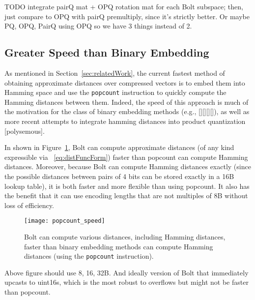 TODO integrate pairQ mat + OPQ rotation mat for each Bolt subspace; then, just compare to OPQ with pairQ premultiply, since it's strictly better. Or maybe PQ, OPQ, PairQ using OPQ so we have 3 things instead of 2.


\subsection{Greater Speed than Binary Embedding}

As mentioned in Section~\ref{sec:relatedWork}, the current fastest method of obtaining approximate distances over compressed vectors is to embed them into Hamming space and use the \texttt{popcount} instruction to quickly compute the Hamming distances between them. Indeed, the speed of this approach is much of the motivation for the class of binary embedding methods (e.g., [][][][]), as well as more recent attempts to integrate hamming distances into product quantization [polysemous].

In shown in Figure~\ref{fig:bolt_vs_popcount}, Bolt can compute approximate distances (of any kind expressible via ~\ref{eq:distFuncForm}) faster than popcount can compute Hamming distances. Moreover, because Bolt can compute Hamming distances exactly (since the possible distances between pairs of 4 bits can be stored exactly in a 16B lookup table), it is both faster and more flexible than using popcount. It also has the benefit that it can use encoding lengths that are not multiples of 8B without loss of efficiency.

\begin{figure}[h]
\begin{center}
\label{fig:bolt_vs_popcount}
\texttt{[image: popcount\_speed]}
\caption{Bolt can compute various distances, including Hamming distances, faster than binary embedding methods can compute Hamming distances (using the \texttt{popcount} instruction).}
\end{center}
\end{figure}

Above figure should use 8, 16, 32B. And ideally version of Bolt that immediately upcasts to uint16s, which is the most robust to overflows but might not be faster than popcount.

